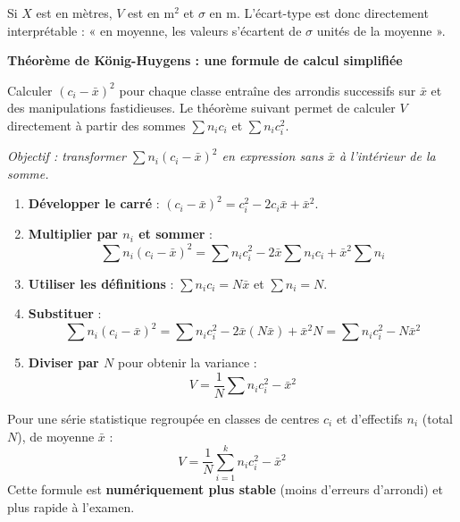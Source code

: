 \documentclass[11pt]{article}
\begin{document}
\begin{savaistu}
Si $X$ est en mètres, $V$ est en $\text{m}^2$ et $\sigma$ en $\text{m}$. L'écart-type est donc directement interprétable : « en moyenne, les valeurs s'écartent de $\sigma$ unités de la moyenne ».
\end{savaistu}

\textbf{Théorème de König-Huygens : une formule de calcul simplifiée}\par
Calculer $(c_i - \bar{x})^2$ pour chaque classe entraîne des arrondis successifs sur $\bar{x}$ et des manipulations fastidieuses. Le théorème suivant permet de calculer $V$ directement à partir des sommes $\sum n_i c_i$ et $\sum n_i c_i^2$.

\begin{experience}
\emph{Objectif : transformer $\sum n_i (c_i - \bar{x})^2$ en expression sans $\bar{x}$ à l'intérieur de la somme.}

\begin{enumerate}
    \item \textbf{Développer le carré} : $(c_i - \bar{x})^2 = c_i^2 - 2c_i\bar{x} + \bar{x}^2$.
    \item \textbf{Multiplier par $n_i$ et sommer} :
    \[
    \sum n_i (c_i - \bar{x})^2 = \sum n_i c_i^2 - 2\bar{x}\sum n_i c_i + \bar{x}^2\sum n_i
    \]
    \item \textbf{Utiliser les définitions} : $\sum n_i c_i = N\bar{x}$ et $\sum n_i = N$.
    \item \textbf{Substituer} :
    \[
    \sum n_i (c_i - \bar{x})^2 = \sum n_i c_i^2 - 2\bar{x}(N\bar{x}) + \bar{x}^2 N = \sum n_i c_i^2 - N\bar{x}^2
    \]
    \item \textbf{Diviser par $N$} pour obtenir la variance :
    \[
    V = \frac{1}{N}\sum n_i c_i^2 - \bar{x}^2
    \]
\end{enumerate}
\end{experience}

\begin{propriete}
Pour une série statistique regroupée en classes de centres $c_i$ et d'effectifs $n_i$ (total $N$), de moyenne $\bar{x}$ :
\[
\boxed{V = \frac{1}{N}\sum_{i=1}^{k} n_i c_i^2 - \bar{x}^2}
\]
Cette formule est \textbf{numériquement plus stable} (moins d'erreurs d'arrondi) et plus rapide à l'examen.
\end{propriete}
\end{document}
